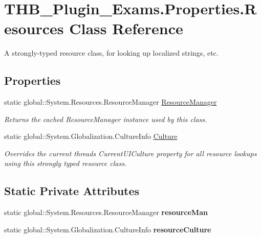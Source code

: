 \hypertarget{class_t_h_b___plugin___exams_1_1_properties_1_1_resources}{}\section{T\+H\+B\+\_\+\+Plugin\+\_\+\+Exams.\+Properties.\+Resources Class Reference}
\label{class_t_h_b___plugin___exams_1_1_properties_1_1_resources}


A strongly-\/typed resource class, for looking up localized strings, etc.  


\subsection*{Properties}
\begin{DoxyCompactItemize}
\item 
static global\+::\+System.\+Resources.\+Resource\+Manager \mbox{\hyperlink{class_t_h_b___plugin___exams_1_1_properties_1_1_resources_ac94e7ac51e431c417ddd588992ec389f}{Resource\+Manager}}
\begin{DoxyCompactList}\small\item\em Returns the cached Resource\+Manager instance used by this class. \end{DoxyCompactList}\item 
static global\+::\+System.\+Globalization.\+Culture\+Info \mbox{\hyperlink{class_t_h_b___plugin___exams_1_1_properties_1_1_resources_ad00eb8a1a616471660b17263b4e580ad}{Culture}}
\begin{DoxyCompactList}\small\item\em Overrides the current thread\textquotesingle{}s Current\+U\+I\+Culture property for all resource lookups using this strongly typed resource class. \end{DoxyCompactList}\end{DoxyCompactItemize}
\subsection*{Static Private Attributes}
\begin{DoxyCompactItemize}
\item 
\mbox{\label{class_t_h_b___plugin___exams_1_1_properties_1_1_resources_aa79b49f6573620ff9eefa40ab92a6ec4}} 
static global\+::\+System.\+Resources.\+Resource\+Manager {\bfseries resource\+Man}
\item 
\mbox{\label{class_t_h_b___plugin___exams_1_1_properties_1_1_resources_a1e7f3e2c2397c586c543807c475b0458}} 
static global\+::\+System.\+Globalization.\+Culture\+Info {\bfseries resource\+Culture}
\end{DoxyCompactItemize}


